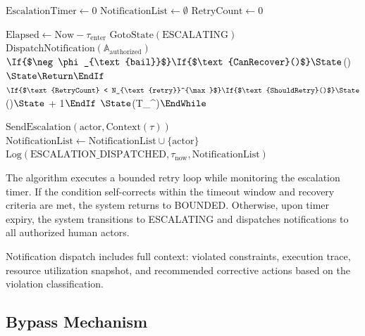 \begin{algorithm}[htbp]
\caption{Escalation Algorithm}
\label{alg:escalation}
\begin{algorithmic}[1]
\State $\text{EscalationTimer} \gets 0$
\State $\text{NotificationList} \gets \emptyset$
\State $\text{RetryCount} \gets 0$

    \State $\text{Elapsed} \gets \text{Now} - \tau_{\text{enter}}$
        \State $\text{GotoState}(\text{ESCALATING})$
        \State $\text{DispatchNotification}(\mathbb{A}_{\text{authorized}})$
        \State \Return
    \EndIf$

    \If{$\neg\phi_{\text{bail}}$}
        \If{$\text{CanRecover}()$}
            \State $()$
            \State \Return
        \EndIf$
    \EndIf$

    \If{$\text{RetryCount} < N_{\text{retry}}^{\max}$}
        \If{$\text{ShouldRetry}()$}
            \State $()$
            \State $ \gets {} + 1$
        \EndIf$
    \EndIf$

    \State $(T_{}^{})$
\EndWhile$

        \State $\text{SendEscalation}(\text{actor}, \text{Context}(\tau))$
        \State $\text{NotificationList} \gets \text{NotificationList} \cup \{\text{actor}\}$
    \EndFor
    \State $\text{Log}(\text{ESCALATION\_DISPATCHED}, \tau_{\text{now}}, \text{NotificationList})$
\EndFunction
\end{algorithmic}
\end{algorithm}

The algorithm executes a bounded retry loop while monitoring the escalation timer. If the condition self-corrects within the timeout window and recovery criteria are met, the system returns to BOUNDED. Otherwise, upon timer expiry, the system transitions to ESCALATING and dispatches notifications to all authorized human actors.

Notification dispatch includes full context: violated constraints, execution trace, resource utilization snapshot, and recommended corrective actions based on the violation classification.

\subsection{Bypass Mechanism}
\label{subsection:bypass_mechanism}

